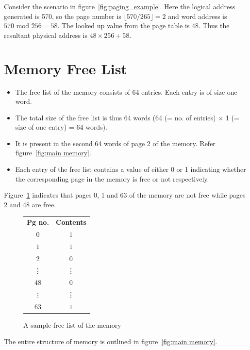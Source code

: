 \begin{example}
	Consider the scenario in figure~\ref{fig:paging_example}. Here the logical address generated is 570, so the page number is $ \lfloor 570/265 \rfloor = 2$ and word address is $570\mbox{ mod }256 = 58$. The looked up value from the page table is $48$. Thus the resultant physical address is $48 \times 256+58$.
\end{example}
	
\section{Memory Free List}
\label{lbl:memlst}

\begin{itemize}
	\item The free list of the memory consists of 64 entries. Each entry is of size one word.
	\item The total size of the free list is thus 64 words (64 (= no. of entries) $\times$ 1 (= size of one entry) = 64 words).
	\item It is present in the second 64 words of page 2 of the memory. Refer figure~\ref{fig:main memory}.
	\item Each entry of the free list contains a value of either 0 or 1 indicating whether the corresponding page in the memory is free or not respectively.
\end{itemize}

\begin{example} 
	Figure~\ref{fig:mem_free_list} indicates that pages 0, 1 and 63 of the memory are not free while pages 2 and 48 are free.
\end{example}

\begin{figure}[htp!] \small
	\centering
	\begin{tabular}{c|c|}
		\textbf{Pg no.} & \textbf{Contents} \\ \cline{2-2}
		$0$ & $1$ \\ \cline{2-2}
		$1$ & $1$ \\ \cline{2-2}
		$2$ & $0$ \\ \cline{2-2}
		\vdots & \vdots \\ \cline{2-2}
		$48$ & $0$ \\ \cline{2-2}
		$\vdots$ & \vdots \\ \cline{2-2}
		$63$ & $1$ \\ \cline{2-2}
	\end{tabular}
	\caption{A sample free list of the memory}
	\label{fig:mem_free_list}
\end{figure}

The entire structure of memory is outlined in figure~\ref{fig:main memory}.
